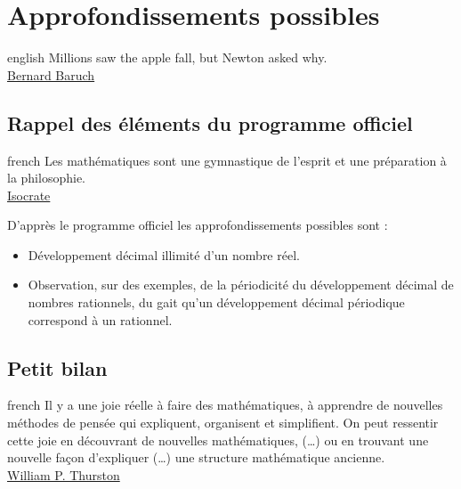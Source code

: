 \documentclass[a4paper, 11pt, twoside]{article}
\begin{document}
\section{Approfondissements possibles}
\label{sec:org58fbff1}

\begin{foreigndisplayquote}{english}
Millions saw the apple fall, but Newton asked why.\\

\href{https://en.wikipedia.org/wiki/Bernard\_Baruch}{Bernard Baruch}
\end{foreigndisplayquote}

\startcontents[level-1]

\subsection{Rappel des éléments du programme officiel}
\label{sec:org2a6ae12}

\begin{foreigndisplayquote}{french}
Les mathématiques sont une gymnastique de l'esprit et une
préparation à la philosophie. \\

\href{https://fr.wikipedia.org/wiki/Isocrate}{Isocrate}
\end{foreigndisplayquote}

\startcontents[level-2]

D'apprès le programme officiel les approfondissements possibles
sont :
\begin{itemize}
\item Développement décimal illimité d'un nombre réel.
\item Observation, sur des exemples, de la périodicité du développement
décimal de nombres rationnels, du gait qu'un développement décimal
périodique correspond à un rationnel.
\end{itemize}
\stopcontents[level-2]

\subsection{Petit bilan}
\label{sec:org9cefe03}

\begin{foreigndisplayquote}{french}
Il y a une joie réelle à faire des mathématiques, à apprendre de
nouvelles méthodes de pensée qui expliquent, organisent et
simplifient. On peut ressentir cette joie en découvrant de
nouvelles mathématiques, (…) ou en trouvant une nouvelle façon
d’expliquer (…) une structure mathématique ancienne. \\

\href{https://en.wikipedia.org/wiki/William\_Thurston}{William P. Thurston}
\end{foreigndisplayquote}
\end{document}
